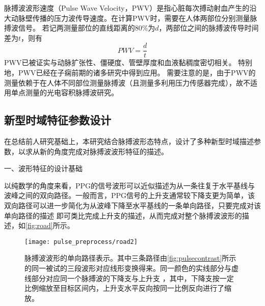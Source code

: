 脉搏波波形速度（Pulse Wave Velocity，PWV）是指心脏每次搏动射血产生的沿大动脉壁传播的压力波传导速度\cite{Van2012}。在计算PWV时，需要在人体两部位分别测量脉搏波信号。
若记两测量部位的直线距离的80\%为$d$，两部位之间的脉搏波传导时间差为$t$，则有
\begin{equation}
    \label{equ:pwv}
    PWV = \frac{d}{t}
\end{equation}
PWV已被证实与动脉扩张性、僵硬度、管壁厚度和血液黏稠度密切相关。
特别地，PWV已经在子痫前期的诸多研究中得到应用\cite{Tomsin2012,Katsipi2014,VivianaIvan2018,Ira2014}。
需要注意的是，由于PWV的测量依赖于在人体不同部位测量脉搏波（且测量多利用压力传感器完成），故不适用单点测量的光电容积脉搏波研究。

\subsection{新型时域特征参数设计}
在总结前人研究基础上，本研究结合脉搏波形态特点，设计了多种新型时域描述参数，以求从新的角度完成对脉搏波波形特征的描述。

一、波形特征的设计基础

以纯数学的角度来看，PPG的信号波形可以近似描述为从一条往复于水平基线与波峰之间的双向路径。一般而言，PPG信号的上升支通常较下降支更为简单，该双向路径可以进一步简化为从波峰下降至水平基线的一条单向路径，只要完成对该单向路径的描述
即可类比完成上升支的描述，从而完成对整个脉搏波波形的描述，如\autoref{fig:road}所示。
\begin{figure}[htbp]
    \centering
    \texttt{[image: pulse\_preprocess/road2]}
    \caption[脉搏波波形的单向路径表示]{\label{fig:road}脉搏波波形的单向路径表示。其中三条路径由\autoref{fig:pulsecontrast}所示的同一被试的三段波形对应线形变换得来。同一颜色的实线部分与虚线部分对应同一个脉搏波的下降支与上升支
    ，其中，下降支按一定比例缩放至目标区间内，上升支水平反向按同一比例反向进行了缩放。}
\end{figure}

